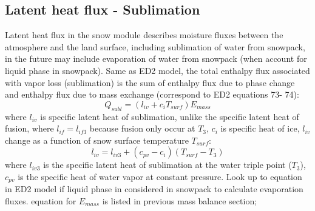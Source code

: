 \documentclass{article}
\begin{document}
\subsection{Latent heat flux - Sublimation}
Latent heat flux in the snow module describes moisture fluxes between the atmosphere and the land surface, including sublimation of water from snowpack, in the future may include evaporation of water from snowpack (when account for liquid phase in snowpack). Same as ED2 model, the total enthalpy flux associated with vapor loss (sublimation) is the sum of enthalpy flux due to phase change and enthalpy flux due to mass exchange (correspond to ED2 equations 73- 74):
\begin{equation}
Q_{subl}=(l_{iv} +c_iT_{surf})E_{mass}
\end{equation}
where $l_{iv}$ is specific latent heat of sublimation, unlike the specific latent heat of fusion,  where $l_{if}=l_{if3}$ because fusion only occur at $T_3$, $c_i$ is specific heat of ice,  $l_{iv}$ change as a function of snow surface temperature $T_{surf}$:  
\begin{equation}
l_{iv} = l_{iv3} + (c_{pv}-c_i)(T_{surf}-T_3)
\end{equation}where $l_{iv3}$ is the specific latent heat of sublimation at the water triple point ($T_3$), $c_{pv}$ is the specific heat of water vapor at constant pressure. Look up to equation in ED2 model if liquid phase in considered in snowpack to calculate evaporation fluxes.
equation for $E_{mass}$ is listed in previous mass balance section;
\end{document}
